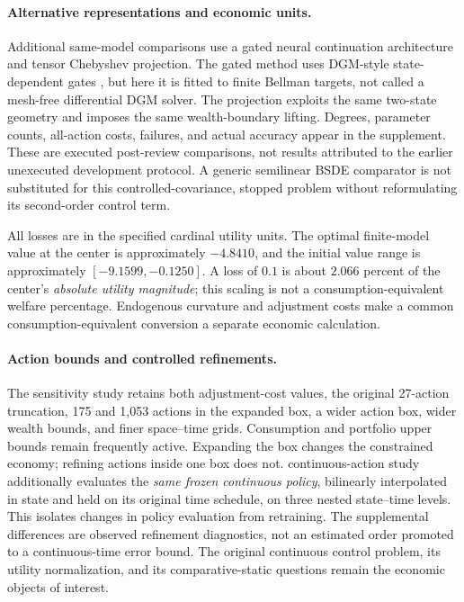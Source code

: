 \paragraph*{Alternative representations and economic units.}
Additional same-model comparisons use a gated neural continuation architecture and tensor Chebyshev projection. The gated method uses DGM-style state-dependent gates \citep{sirignano2018}, but here it is fitted to finite Bellman targets, not called a mesh-free differential DGM solver. The projection exploits the same two-state geometry and imposes the same wealth-boundary lifting. Degrees, parameter counts, all-action costs, failures, and actual accuracy appear in the supplement. These are executed post-review comparisons, not results attributed to the earlier unexecuted development protocol. A generic semilinear BSDE comparator is not substituted for this controlled-covariance, stopped problem without reformulating its second-order control term.

All losses are in the specified cardinal utility units. The optimal finite-model value at the center is approximately $-4.8410$, and the initial value range is approximately $[-9.1599,-0.1250]$. A loss of $0.1$ is about $2.066$ percent of the center's \emph{absolute utility magnitude}; this scaling is not a consumption-equivalent welfare percentage. Endogenous curvature and adjustment costs make a common consumption-equivalent conversion a separate economic calculation.

\paragraph*{Action bounds and controlled refinements.}
The sensitivity study retains both adjustment-cost values, the original 27-action truncation, 175 and 1,053 actions in the expanded box, a wider action box, wider wealth bounds, and finer space--time grids. Consumption and portfolio upper bounds remain frequently active. Expanding the box changes the constrained economy; refining actions inside one box does not. continuous-action study additionally evaluates the \emph{same frozen continuous policy}, bilinearly interpolated in state and held on its original time schedule, on three nested state--time levels. This isolates changes in policy evaluation from retraining. The supplemental differences are observed refinement diagnostics, not an estimated order promoted to a continuous-time error bound. The original continuous control problem, its utility normalization, and its comparative-static questions remain the economic objects of interest.



